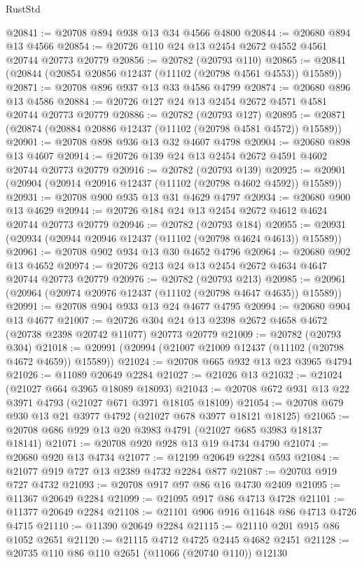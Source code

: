 \begin{lexlean}{RustStd}
\begin{coremodule}
@20841 := @20708 @894 @938 @13 @34 @4566 @4800
@20844 := @20680 @894 @13 @4566
@20854 := @20726 @110 @24 @13 @2454 @2672 @4552 @4561 @20744 @20773 @20779
@20856 := @20782 (@20793 @110)
@20865 := @20841 (@20844 (@20854 @20856 @12437 (@11102 (@20798 @4561 @4553)) @15589))
@20871 := @20708 @896 @937 @13 @33 @4586 @4799
@20874 := @20680 @896 @13 @4586
@20884 := @20726 @127 @24 @13 @2454 @2672 @4571 @4581 @20744 @20773 @20779
@20886 := @20782 (@20793 @127)
@20895 := @20871 (@20874 (@20884 @20886 @12437 (@11102 (@20798 @4581 @4572)) @15589))
@20901 := @20708 @898 @936 @13 @32 @4607 @4798
@20904 := @20680 @898 @13 @4607
@20914 := @20726 @139 @24 @13 @2454 @2672 @4591 @4602 @20744 @20773 @20779
@20916 := @20782 (@20793 @139)
@20925 := @20901 (@20904 (@20914 @20916 @12437 (@11102 (@20798 @4602 @4592)) @15589))
@20931 := @20708 @900 @935 @13 @31 @4629 @4797
@20934 := @20680 @900 @13 @4629
@20944 := @20726 @184 @24 @13 @2454 @2672 @4612 @4624 @20744 @20773 @20779
@20946 := @20782 (@20793 @184)
@20955 := @20931 (@20934 (@20944 @20946 @12437 (@11102 (@20798 @4624 @4613)) @15589))
@20961 := @20708 @902 @934 @13 @30 @4652 @4796
@20964 := @20680 @902 @13 @4652
@20974 := @20726 @213 @24 @13 @2454 @2672 @4634 @4647 @20744 @20773 @20779
@20976 := @20782 (@20793 @213)
@20985 := @20961 (@20964 (@20974 @20976 @12437 (@11102 (@20798 @4647 @4635)) @15589))
@20991 := @20708 @904 @933 @13 @24 @4677 @4795
@20994 := @20680 @904 @13 @4677
@21007 := @20726 @304 @24 @13 @2398 @2672 @4658 @4672 (@20738 @2398 @20742 @11077) @20773 @20779
@21009 := @20782 (@20793 @304)
@21018 := @20991 (@20994 (@21007 @21009 @12437 (@11102 (@20798 @4672 @4659)) @15589))
@21024 := @20708 @665 @932 @13 @23 @3965 @4794
@21026 := @11089 @20649 @2284
@21027 := @21026 @13
@21032 := @21024 (@21027 @664 @3965 @18089 @18093)
@21043 := @20708 @672 @931 @13 @22 @3971 @4793 (@21027 @671 @3971 @18105 @18109)
@21054 := @20708 @679 @930 @13 @21 @3977 @4792 (@21027 @678 @3977 @18121 @18125)
@21065 := @20708 @686 @929 @13 @20 @3983 @4791 (@21027 @685 @3983 @18137 @18141)
@21071 := @20708 @920 @928 @13 @19 @4734 @4790
@21074 := @20680 @920 @13 @4734
@21077 := @12199 @20649 @2284 @593
@21084 := @21077 @919 @727 @13 @2389 @4732 @2284 @877
@21087 := @20703 @919 @727 @4732
@21093 := @20708 @917 @97 @86 @16 @4730 @2409
@21095 := @11367 @20649 @2284
@21099 := @21095 @917 @86 @4713 @4728
@21101 := @11377 @20649 @2284
@21108 := @21101 @906 @916 @11648 @86 @4713 @4726 @4715
@21110 := @11390 @20649 @2284
@21115 := @21110 @201 @915 @86 @1052 @2651
@21120 := @21115 @4712 @4725 @2445 @4682 @2451
@21128 := @20735 @110 @86 @110 @2651 (@11066 (@20740 @110)) @12130

\end{coremodule}
\end{lexlean}
